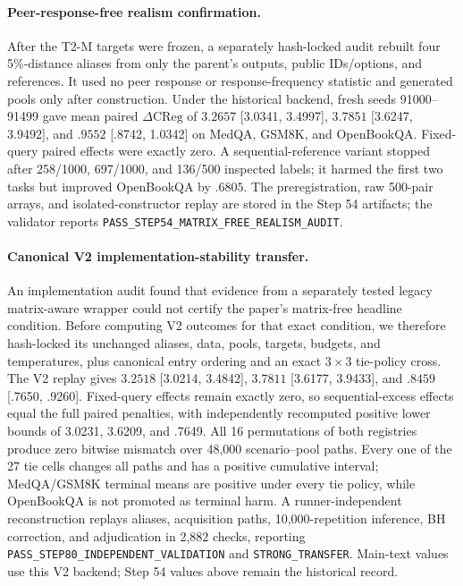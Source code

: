 \paragraph{Peer-response-free realism confirmation.}
After the T2-M targets were frozen, a separately hash-locked audit rebuilt four 5\%-distance aliases from only the parent's outputs, public IDs/options, and references. It used no peer response or response-frequency statistic and generated pools only after construction. Under the historical backend, fresh seeds 91000--91499 gave mean paired $\Delta\mathrm{CReg}$ of $3.2657$ [3.0341, 3.4997], $3.7851$ [3.6247, 3.9492], and $.9552$ [.8742, 1.0342] on MedQA, GSM8K, and OpenBookQA. Fixed-query paired effects were exactly zero. A sequential-reference variant stopped after 258/1000, 697/1000, and 136/500 inspected labels; it harmed the first two tasks but improved OpenBookQA by $.6805$. The preregistration, raw 500-pair arrays, and isolated-constructor replay are stored in the Step 54 artifacts; the validator reports \texttt{PASS\_STEP54\_MATRIX\_FREE\_REALISM\_AUDIT}.

\paragraph{Canonical V2 implementation-stability transfer.}
An implementation audit found that evidence from a separately tested legacy matrix-aware wrapper could not certify the paper's matrix-free headline condition. Before computing V2 outcomes for that exact condition, we therefore hash-locked its unchanged aliases, data, pools, targets, budgets, and temperatures, plus canonical entry ordering and an exact $3\times3$ tie-policy cross. The V2 replay gives $3.2518$ [3.0214, 3.4842], $3.7811$ [3.6177, 3.9433], and $.8459$ [.7650, .9260]. Fixed-query effects remain exactly zero, so sequential-excess effects equal the full paired penalties, with independently recomputed positive lower bounds of 3.0231, 3.6209, and .7649. All 16 permutations of both registries produce zero bitwise mismatch over 48,000 scenario--pool paths. Every one of the 27 tie cells changes all paths and has a positive cumulative interval; MedQA/GSM8K terminal means are positive under every tie policy, while OpenBookQA is not promoted as terminal harm. A runner-independent reconstruction replays aliases, acquisition paths, 10,000-repetition inference, BH correction, and adjudication in 2,882 checks, reporting \texttt{PASS\_STEP80\_INDEPENDENT\_VALIDATION} and \texttt{STRONG\_TRANSFER}. Main-text values use this V2 backend; Step 54 values above remain the historical record.

